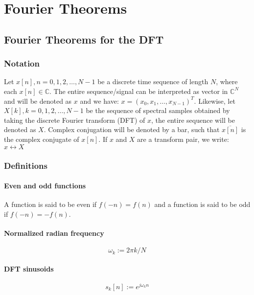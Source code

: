 \section{Fourier Theorems}

\subsection{Fourier Theorems for the DFT}

\subsubsection{Notation}
Let $x[n], n = 0, 1, 2, \ldots, N-1$ be a discrete time sequence of length $N$, where each $x[n] \in \mathbb{C}$. The entire sequence/signal can be interpreted as vector in $\mathbb{C}^N$ and will be denoted as $x$ and we have: $x = (x_0, x_1, \ldots, x_{N-1})^T$. Likewise, let $X[k], k = 0, 1, 2, \ldots, N-1$ be the sequence of spectral samples obtained by taking the discrete Fourier transform (DFT) of $x$, the entire sequence will be denoted as $X$. Complex conjugation will be denoted by a bar, such that $\overline{x[n]}$ is the complex conjugate of $x[n]$. If $x$ and $X$ are a transform pair, we write: $x \leftrightarrow X$

\subsubsection{Definitions}

\paragraph{Even and odd functions}
A function is said to be even if $f(-n) = f(n)$ and a function is said to be odd if $f(-n) = -f(n)$.

\paragraph{Normalized radian frequency}
\begin{equation}
  \omega_k := 2 \pi k / N
\end{equation}

\paragraph{DFT sinusoids}
\begin{equation}
  s_k[n] := e^{ j \omega_k n }
\end{equation}

